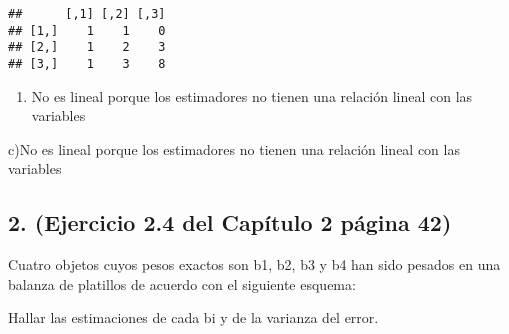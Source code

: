 \documentclass[
]{article}
\providecommand{\tightlist}{%
  \setlength{\itemsep}{0pt}\setlength{\parskip}{0pt}}
\begin{document}
\begin{verbatim}
##      [,1] [,2] [,3]
## [1,]    1    1    0
## [2,]    1    2    3
## [3,]    1    3    8
\end{verbatim}

\begin{enumerate}
\def\labelenumi{\alph{enumi})}
\setcounter{enumi}{1}
\tightlist
\item
  No es lineal porque los estimadores no tienen una relación lineal con
  las variables
\end{enumerate}

c)No es lineal porque los estimadores no tienen una relación lineal con
las variables

\hypertarget{ejercicio-2.4-del-capuxedtulo-2-puxe1gina-42}{%
\subsection{2. (Ejercicio 2.4 del Capítulo 2 página
42)}\label{ejercicio-2.4-del-capuxedtulo-2-puxe1gina-42}}

Cuatro objetos cuyos pesos exactos son b1, b2, b3 y b4 han sido pesados
en una balanza de platillos de acuerdo con el siguiente esquema:

Hallar las estimaciones de cada bi y de la varianza del error.
\end{document}
